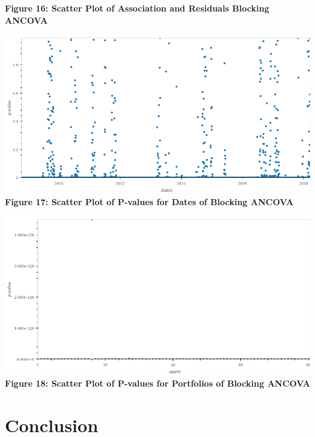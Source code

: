 \documentclass[11pt]{article}
\makeatletter
\def\maxwidth{\ifdim\Gin@nat@width>\linewidth\linewidth
    \else\Gin@nat@width\fi}
\let\Oldincludegraphics\includegraphics
\renewcommand{\includegraphics}[1]{\Oldincludegraphics[width=.8\maxwidth]{#1}}
\makeatother
\begin{document}
\textbf{Figure 16: Scatter Plot of Association and Residuals Blocking
ANCOVA }

\includegraphics{../experiments/media/Scatter Plot of P-values for dates of Blocking Ancova.png}\\

\textbf{Figure 17: Scatter Plot of P-values for Dates of Blocking
ANCOVA}

\includegraphics{../experiments/media/Scatter Plot of P-values for shares in a portfolio of Blocking Ancova.png}\\

\textbf{Figure 18: Scatter Plot of P-values for Portfolios of Blocking
ANCOVA}

\newpage

\hypertarget{conclusion}{%
\section{Conclusion}\label{conclusion}}
\end{document}
